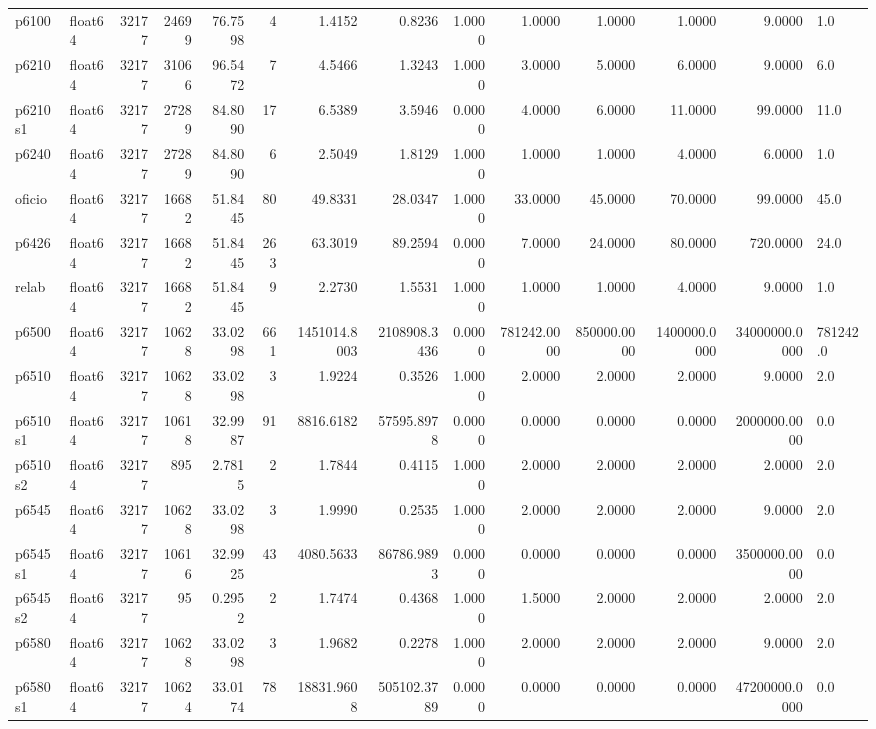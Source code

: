 \begin{longtable}{llrrrrrrrrrrrl}
p6100 & float64 & 32177 & 24699 & 76.7598 & 4 & 1.4152 & 0.8236 & 1.0000 & 1.0000 & 1.0000 & 1.0000 & 9.0000 & 1.0 \\
p6210 & float64 & 32177 & 31066 & 96.5472 & 7 & 4.5466 & 1.3243 & 1.0000 & 3.0000 & 5.0000 & 6.0000 & 9.0000 & 6.0 \\
p6210s1 & float64 & 32177 & 27289 & 84.8090 & 17 & 6.5389 & 3.5946 & 0.0000 & 4.0000 & 6.0000 & 11.0000 & 99.0000 & 11.0 \\
p6240 & float64 & 32177 & 27289 & 84.8090 & 6 & 2.5049 & 1.8129 & 1.0000 & 1.0000 & 1.0000 & 4.0000 & 6.0000 & 1.0 \\
oficio & float64 & 32177 & 16682 & 51.8445 & 80 & 49.8331 & 28.0347 & 1.0000 & 33.0000 & 45.0000 & 70.0000 & 99.0000 & 45.0 \\
p6426 & float64 & 32177 & 16682 & 51.8445 & 263 & 63.3019 & 89.2594 & 0.0000 & 7.0000 & 24.0000 & 80.0000 & 720.0000 & 24.0 \\
relab & float64 & 32177 & 16682 & 51.8445 & 9 & 2.2730 & 1.5531 & 1.0000 & 1.0000 & 1.0000 & 4.0000 & 9.0000 & 1.0 \\
p6500 & float64 & 32177 & 10628 & 33.0298 & 661 & 1451014.8003 & 2108908.3436 & 0.0000 & 781242.0000 & 850000.0000 & 1400000.0000 & 34000000.0000 & 781242.0 \\
p6510 & float64 & 32177 & 10628 & 33.0298 & 3 & 1.9224 & 0.3526 & 1.0000 & 2.0000 & 2.0000 & 2.0000 & 9.0000 & 2.0 \\
p6510s1 & float64 & 32177 & 10618 & 32.9987 & 91 & 8816.6182 & 57595.8978 & 0.0000 & 0.0000 & 0.0000 & 0.0000 & 2000000.0000 & 0.0 \\
p6510s2 & float64 & 32177 & 895 & 2.7815 & 2 & 1.7844 & 0.4115 & 1.0000 & 2.0000 & 2.0000 & 2.0000 & 2.0000 & 2.0 \\
p6545 & float64 & 32177 & 10628 & 33.0298 & 3 & 1.9990 & 0.2535 & 1.0000 & 2.0000 & 2.0000 & 2.0000 & 9.0000 & 2.0 \\
p6545s1 & float64 & 32177 & 10616 & 32.9925 & 43 & 4080.5633 & 86786.9893 & 0.0000 & 0.0000 & 0.0000 & 0.0000 & 3500000.0000 & 0.0 \\
p6545s2 & float64 & 32177 & 95 & 0.2952 & 2 & 1.7474 & 0.4368 & 1.0000 & 1.5000 & 2.0000 & 2.0000 & 2.0000 & 2.0 \\
p6580 & float64 & 32177 & 10628 & 33.0298 & 3 & 1.9682 & 0.2278 & 1.0000 & 2.0000 & 2.0000 & 2.0000 & 9.0000 & 2.0 \\
p6580s1 & float64 & 32177 & 10624 & 33.0174 & 78 & 18831.9608 & 505102.3789 & 0.0000 & 0.0000 & 0.0000 & 0.0000 & 47200000.0000 & 0.0 \\

\end{longtable}
